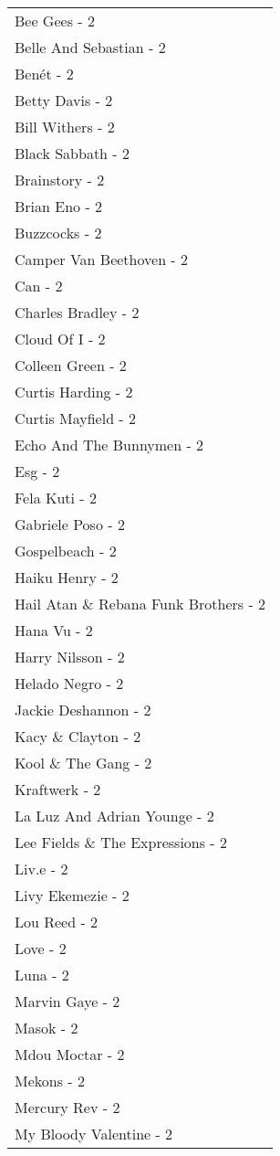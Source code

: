 \documentclass[
]{article}
\begin{document}
\begin{longtable}{l}
Bee Gees - 2 \\ 
Belle And Sebastian - 2 \\ 
Benét - 2 \\ 
Betty Davis - 2 \\ 
Bill Withers - 2 \\ 
Black Sabbath - 2 \\ 
Brainstory - 2 \\ 
Brian Eno - 2 \\ 
Buzzcocks - 2 \\ 
Camper Van Beethoven - 2 \\ 
Can - 2 \\ 
Charles Bradley - 2 \\ 
Cloud Of I - 2 \\ 
Colleen Green - 2 \\ 
Curtis Harding - 2 \\ 
Curtis Mayfield - 2 \\ 
Echo And The Bunnymen - 2 \\ 
Esg - 2 \\ 
Fela Kuti - 2 \\ 
Gabriele Poso - 2 \\ 
Gospelbeach - 2 \\ 
Haiku Henry - 2 \\ 
Hail Atan \& Rebana Funk Brothers - 2 \\ 
Hana Vu - 2 \\ 
Harry Nilsson - 2 \\ 
Helado Negro - 2 \\ 
Jackie Deshannon - 2 \\ 
Kacy \& Clayton - 2 \\ 
Kool \& The Gang - 2 \\ 
Kraftwerk - 2 \\ 
La Luz And Adrian Younge - 2 \\ 
Lee Fields \& The Expressions - 2 \\ 
Liv.e - 2 \\ 
Livy Ekemezie - 2 \\ 
Lou Reed - 2 \\ 
Love - 2 \\ 
Luna - 2 \\ 
Marvin Gaye - 2 \\ 
Masok - 2 \\ 
Mdou Moctar - 2 \\ 
Mekons - 2 \\ 
Mercury Rev - 2 \\ 
My Bloody Valentine - 2 \\ 

\end{longtable}
\end{document}
